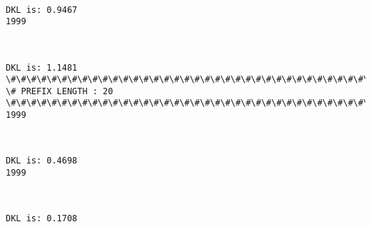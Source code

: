 \documentclass[11pt]{article}
\begin{document}
    \begin{center}
    \end{center}
    { \hspace*{\fill} \\}
    
    \begin{Verbatim}[commandchars=\\\{\}]
DKL is: 0.9467
1999

    \end{Verbatim}

    \begin{center}
    \end{center}
    { \hspace*{\fill} \\}
    
    \begin{Verbatim}[commandchars=\\\{\}]
DKL is: 1.1481
\#\#\#\#\#\#\#\#\#\#\#\#\#\#\#\#\#\#\#\#\#\#\#\#\#\#\#\#\#\#\#\#\#\#\#\#\#\#\#\#\#\#\#\#\#\#\#\#\#\#\#\#\#\#\#\#\#\#\#\#\#\#\#\#\#\#\#\#\#\#\#\#\#\#\#\#
\# PREFIX LENGTH : 20
\#\#\#\#\#\#\#\#\#\#\#\#\#\#\#\#\#\#\#\#\#\#\#\#\#\#\#\#\#\#\#\#\#\#\#\#\#\#\#\#\#\#\#\#\#\#\#\#\#\#\#\#\#\#\#\#\#\#\#\#\#\#\#\#\#\#\#\#\#\#\#\#\#\#\#\#
1999

    \end{Verbatim}

    \begin{center}
    \end{center}
    { \hspace*{\fill} \\}
    
    \begin{Verbatim}[commandchars=\\\{\}]
DKL is: 0.4698
1999

    \end{Verbatim}

    \begin{center}
    \end{center}
    { \hspace*{\fill} \\}
    
    \begin{Verbatim}[commandchars=\\\{\}]
DKL is: 0.1708

    \end{Verbatim}


    
    
    
    
\end{document}
